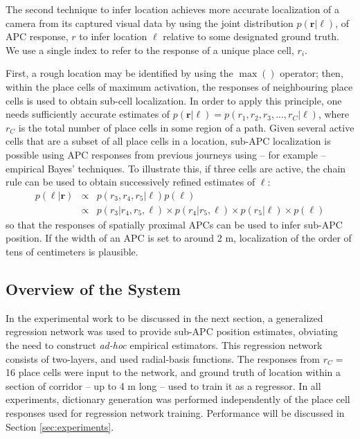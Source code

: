The second technique to infer location achieves more accurate localization of a camera from its captured visual data by using the joint distribution $p(\mathbf{r}|\ell)$, of APC response, $r$ to infer location $\ell$ relative to some designated ground truth.  We use a single index to refer to the response of a unique place cell, $r_i$.

 First, a rough location may be identified by using the $\max()$ operator; then, within the place cells of maximum activation, the responses of neighbouring place cells is used to obtain sub-cell localization.  In order to apply this principle, one needs sufficiently accurate estimates of $p(\mathbf{r}|\ell) = p(r_1,r_2,r_3,...,r_C|\ell)$, where $r_C$ is the total number of place cells in some region of a path.   Given several active cells that are a subset of all place cells in a location, sub-APC localization is possible using APC responses from previous journeys using -- for example -- empirical Bayes' techniques. To illustrate this, if three cells are active, the chain rule can be used to obtain successively refined estimates of $\ell$:
\begin{eqnarray}
p(\ell|\mathbf{r}) & \propto & p(r_3,r_4,r_5|\ell)p(\ell) \nonumber \\
&\propto& p(r_3|r_4,r_5,\ell)\times p(r_4|r_5,\ell)\times p(r_5|\ell)\times p(\ell)
\end{eqnarray}
 so that the responses of spatially proximal APCs can be used to infer sub-APC position.  If the width of an APC is set to around 2 m, localization of the order of tens of centimeters is plausible. 





\subsection{Overview of the System}

In the experimental work to be discussed in the next section, a generalized regression network was used to provide sub-APC position estimates, obviating the need to construct {\em ad-hoc} empirical estimators.  This regression network consists of two-layers, and used radial-basis functions.  The responses from $r_C =$ 16 place cells were input to the network, and ground truth of location within a section of corridor -- up to 4 m long -- used to train it as a regressor.  In all experiments, dictionary generation was performed independently of the place cell responses used for regression network training.  Performance will be discussed in Section \ref{sec:experiments}.

